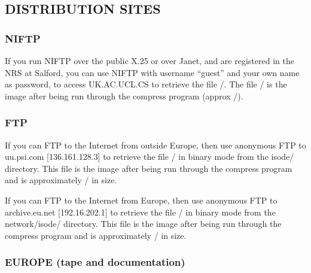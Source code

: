 \subsection*{DISTRIBUTION SITES}

\subsubsection*{NIFTP}
If you run NIFTP over the public X.25 or over Janet, and are
registered in the NRS at Salford, you can use NIFTP with username
``guest'' and your own name as password, to access UK.AC.UCL.CS to
retrieve the file \uktarfile/.  The
file \ukcompressfile/ is the  image after being run through the
compress program (approx \compresssize/).


\subsubsection*{FTP}
If you can FTP to the Internet from outside Europe, then use anonymous
FTP to uu.psi.com [136.161.128.3] to retrieve the file \compressfile/ in
binary mode from the isode/ directory.  This file is the  image
after being run through the compress program and is approximately
\compresssize/ in size.

\medskip
If you can FTP to the Internet from Europe, then use anonymous FTP to
archive.eu.net [192.16.202.1] to retrieve the file \compressfile/ in binary
mode from the network/isode/ directory. This file is the  image
after being run through the compress program and is approximately
\compresssize/ in size.


\subsubsection*{EUROPE (tape and documentation)}

